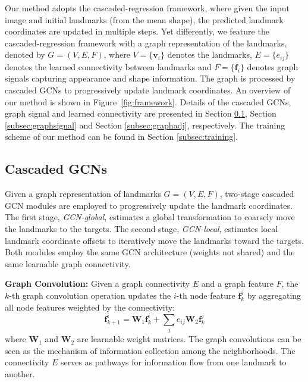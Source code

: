 \documentclass[runningheads]{llncs}
\begin{document}
Our method adopts the cascaded-regression framework, where given the input image and initial landmarks (from the mean shape), the predicted landmark coordinates are updated in multiple steps. Yet differently, we feature the cascaded-regression framework with a graph representation of the landmarks, denoted by $G=(V, E, F)$, where $V=\{\mathbf{v}_i\}$ denotes the landmarks, $E=\{e_{ij}\}$ denotes the learned connectivity between landmarks and $F=\{\mathbf{f}_i\}$ denotes graph signals capturing appearance and shape information. The graph is processed by cascaded GCNs to progressively update landmark coordinates. An overview of our method is shown in Figure~\ref{fig:framework}. Details of the cascaded GCNs, graph signal and learned connectivity are presented in Section \ref{subsec:gcn}, Section \ref{subsec:graphsignal} and Section \ref{subsec:graphadj}, respectively. The training scheme of our method can be found in Section \ref{subsec:training}.

\subsection{Cascaded GCNs}
\label{subsec:gcn}

Given a graph representation of landmarks $G=(V, E, F)$, two-stage cascaded GCN modules are employed to progressively update the landmark coordinates. The first stage, \textit{GCN-global}, estimates a global transformation to coarsely move the landmarks to the targets. The second stage, \textit{GCN-local}, estimates local landmark coordinate offsets to iteratively move the landmarks toward the targets. Both modules employ the same GCN architecture (weights not shared) and the same learnable graph connectivity. 

\textbf{Graph Convolution:} 
Given a graph connectivity $E$ and a graph feature $F$, the $k$-th graph convolution operation updates the $i$-th node feature $\mathbf{f}^j_k$ by aggregating all node features weighted by the connectivity:
\begin{equation}
	\mathbf{f}^i_{k+1} = \mathbf{W}_1\mathbf{f}^i_k + \sum_{j}e_{ij} \mathbf{W}_2\mathbf{f}^j_k
	\label{eqn:graph_conv}
\end{equation}
where $\mathbf{W}_1$ and $\mathbf{W}_2$ are learnable weight matrices. The graph convolutions can be seen as the mechanism of information collection among the neighborhoods. The connectivity $E$ serves as pathways for information flow from one landmark to another. 
\end{document}
